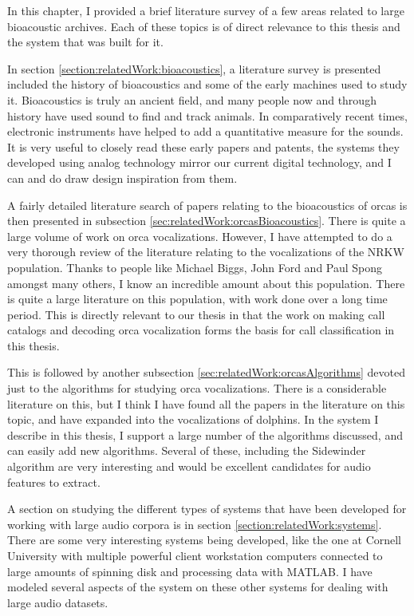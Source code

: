 In this chapter, I provided a brief literature survey of a few areas
related to large bioacoustic archives.  Each of these topics is of
direct relevance to this thesis and the system that was built for it.

In section \ref{section:relatedWork:bioacoustics}, a literature survey
is presented included the history of bioacoustics and some of the
early machines used to study it.  Bioacoustics is truly an ancient
field, and many people now and through history have used sound to find
and track animals.  In comparatively recent times, electronic
instruments have helped to add a quantitative measure for the sounds.
It is very useful to closely read these early papers and patents, the
systems they developed using analog technology mirror our current
digital technology, and I can and do draw design inspiration from
them.

A fairly detailed literature search of papers relating to the
bioacoustics of orcas is then presented in subsection
\ref{sec:relatedWork:orcasBioacoustics}.  There is quite a large
volume of work on orca vocalizations.  However, I have attempted to do
a very thorough review of the literature relating to the vocalizations
of the NRKW population.  Thanks to people like Michael Biggs, John
Ford and Paul Spong amongst many others, I know an incredible amount
about this population.  There is quite a large literature on this
population, with work done over a long time period.  This is directly
relevant to our thesis in that the work on making call catalogs and
decoding orca vocalization forms the basis for call classification in
this thesis.

This is followed by another subsection
\ref{sec:relatedWork:orcasAlgorithms} devoted just to the algorithms
for studying orca vocalizations.  There is a considerable literature
on this, but I think I have found all the papers in the literature on
this topic, and have expanded into the vocalizations of dolphins.  In
the system I describe in this thesis, I support a large number of the
algorithms discussed, and can easily add new algorithms.  Several of
these, including the Sidewinder algorithm are very interesting and
would be excellent candidates for audio features to extract.

A section on studying the different types of systems that have been
developed for working with large audio corpora is in section
\ref{section:relatedWork:systems}.  There are some very interesting
systems being developed, like the one at Cornell University with
multiple powerful client workstation computers connected to large
amounts of spinning disk and processing data with MATLAB.  I have
modeled several aspects of the system on these other systems for
dealing with large audio datasets.

